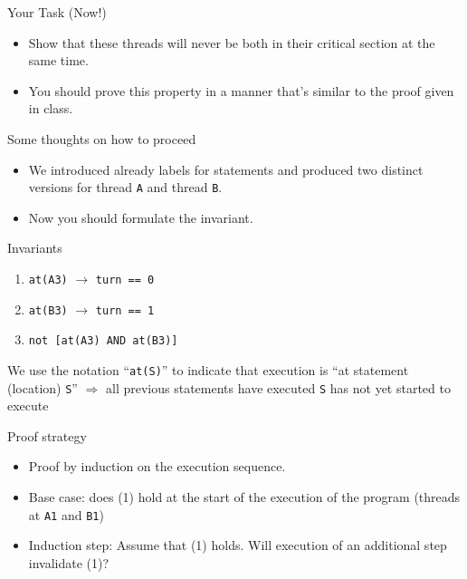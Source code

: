 \begin{frame}[fragile]{Your Task (Now!)}
  \begin{itemize}
  \item Show that these threads will never be both in their critical
    section at the same time.
  \item You should prove this property in a manner that’s similar to
    the proof given in class.
  \end{itemize}
\end{frame}

\begin{frame}{Some thoughts on how to proceed}
  \begin{itemize}
  \item We introduced already labels for statements and produced two
    distinct versions for thread \lstinline!A! and thread
    \lstinline!B!.
  \item Now you should formulate the invariant.
  \end{itemize}  
\end{frame}

\begin{frame}[fragile]{Invariants}
  \begin{enumerate}
  \item \lstinline!at(A3)! $\rightarrow$ \lstinline!turn == 0!
  \item \lstinline!at(B3)! $\rightarrow$ \lstinline!turn == 1!
  \item \lstinline!not [at(A3) AND at(B3)]!
  \end{enumerate}


  We use the notation ``\lstinline!at(S)!'' to indicate that execution
  is ``at statement (location) \lstinline!S!'' $\Rightarrow$ all
  previous statements have executed \lstinline!S! has not yet started
  to execute
\end{frame}

\begin{frame}{Proof strategy}
  \begin{itemize}
  \item Proof by induction on the execution sequence.
  \item Base case: does (1) hold at the start of the execution of the
    program (threads at \lstinline!A1! and \lstinline!B1!)
 \item Induction step: Assume that (1) holds. Will execution of an
   additional step invalidate (1)?
  \end{itemize}
\end{frame}

